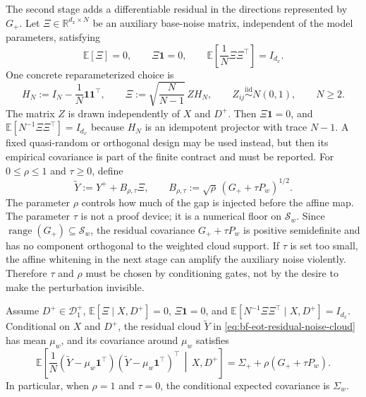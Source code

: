 The second stage adds a differentiable residual in the directions represented by
\(G_+\).  Let \(\Xi\in\mathbb R^{d_x\times N}\) be an auxiliary base-noise
matrix, independent of the model parameters, satisfying
\[
  \mathbb E[\Xi]=0,
  \qquad
  \Xi\mathbf 1=0,
  \qquad
  \mathbb E\!\left[\frac1N\Xi\Xi^\top\right]=I_{d_x}.
\]
One concrete reparameterized choice is
\[
  H_N:=I_N-\frac1N\mathbf 1\mathbf 1^\top,
  \qquad
  \Xi:=\sqrt{\frac{N}{N-1}}\, ZH_N,
  \qquad
  Z_{ij}\stackrel{\mathrm{iid}}{\sim}N(0,1),
  \qquad N\ge2.
\]
The matrix \(Z\) is drawn independently of \(X\) and \(D^+\).  Then
\(\Xi\mathbf 1=0\), and
\(\mathbb E[N^{-1}\Xi\Xi^\top]=I_{d_x}\) because \(H_N\) is an idempotent
projector with trace \(N-1\).  A fixed quasi-random or orthogonal design may be
used instead, but then its empirical covariance is part of the finite contract
and must be reported.  For \(0\le\rho\le1\) and \(\tau\ge0\), define
\begin{equation}
\label{eq:bf-eot-residual-noise-cloud}
  \widetilde Y
  :=
  Y^+
  +
  B_{\rho,\tau}\Xi,
  \qquad
  B_{\rho,\tau}
  :=
  \sqrt{\rho}\,(G_+ + \tau P_w)^{1/2}.
\end{equation}
The parameter \(\rho\) controls how much of the gap is injected before the
affine map.  The parameter \(\tau\) is not a proof device; it is a numerical
floor on \(\mathcal S_w\).  Since
\(\operatorname{range}(G_+)\subseteq\mathcal S_w\), the residual covariance
\(G_+ + \tau P_w\) is positive semidefinite and has no component orthogonal to
the weighted cloud support.  If \(\tau\) is set too small, the affine whitening
in the next stage can amplify the auxiliary noise violently.  Therefore
\(\tau\) and \(\rho\) must be chosen by conditioning gates, not by the desire to
make the perturbation invisible.

\begin{proposition}
\label{prop:bf-eot-residual-expected-covariance}
Assume \(D^+\in\mathcal D_1^+\), \(\mathbb E[\Xi\mid X,D^+]=0\),
\(\Xi\mathbf 1=0\), and
\(\mathbb E[N^{-1}\Xi\Xi^\top\mid X,D^+]=I_{d_x}\).  Conditional on \(X\) and \(D^+\),
the residual cloud \(\widetilde Y\) in
\eqref{eq:bf-eot-residual-noise-cloud} has mean \(\mu_w\), and its covariance
around \(\mu_w\) satisfies
\begin{equation}
\label{eq:bf-eot-residual-expected-covariance}
  \mathbb E\!\left[
    \frac1N(\widetilde Y-\mu_w\mathbf 1^\top)
    (\widetilde Y-\mu_w\mathbf 1^\top)^\top
    \,\middle|\,X,D^+
  \right]
  =
  \Sigma_+ + \rho(G_+ + \tau P_w).
\end{equation}
In particular, when \(\rho=1\) and \(\tau=0\), the conditional expected
covariance is \(\Sigma_w\).
\end{proposition}

